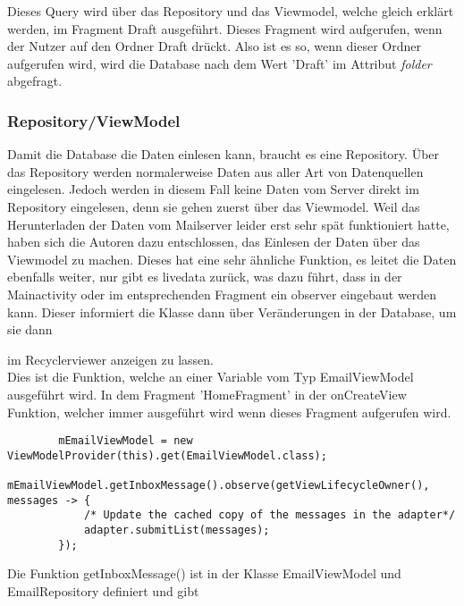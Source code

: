 \documentclass[a4paper,11pt]{article}
\begin{document}
Dieses Query wird über das Repository und das Viewmodel, welche gleich erklärt werden, im Fragment Draft ausgeführt. Dieses Fragment wird aufgerufen, wenn der Nutzer 
auf den Ordner Draft drückt. Also ist es so, wenn dieser Ordner aufgerufen wird, wird die Database nach dem Wert 'Draft' im Attribut \textit{folder} abgefragt.

\subsubsection{Repository/ViewModel}

\begingroup
\setlength{\intextsep}{1pt}
\setlength{\columnsep}{4pt}



Damit die Database die Daten einlesen kann, braucht es eine Repository. Über das Repository werden normalerweise Daten aus aller Art von Datenquellen eingelesen. Jedoch
werden in diesem Fall keine Daten vom Server direkt im Repository eingelesen, denn sie gehen zuerst über das Viewmodel.
Weil das Herunterladen der Daten vom Mailserver leider erst sehr spät funktioniert hatte, 
haben sich die Autoren dazu entschlossen, das Einlesen der Daten über das Viewmodel zu machen. Dieses hat eine sehr ähnliche Funktion, 
es leitet die Daten ebenfalls weiter, nur gibt es \gls{livedata} zurück, was dazu führt, dass in der Mainactivity oder im entsprechenden Fragment ein \gls{observer} 
eingebaut werden kann. Dieser informiert die Klasse dann über Veränderungen in der Database, um sie dann

im Recyclerviewer anzeigen zu lassen.
\cite{appStructurePicture}\\


Dies ist die Funktion, welche an einer Variable vom Typ EmailViewModel ausgeführt wird. In dem Fragment 'HomeFragment' in der
onCreateView Funktion, welcher immer ausgeführt wird wenn dieses Fragment aufgerufen wird. 


\lstset{language=java}
\begin{lstlisting}
        mEmailViewModel = new ViewModelProvider(this).get(EmailViewModel.class);
        mEmailViewModel.getInboxMessage().observe(getViewLifecycleOwner(), messages -> {
            /* Update the cached copy of the messages in the adapter*/
            adapter.submitList(messages);
        });
\end{lstlisting}

\begingroup
\nohyphenation

Die Funktion getInboxMessage() ist in der Klasse EmailViewModel und EmailRepository definiert und gibt 
\end{document}

